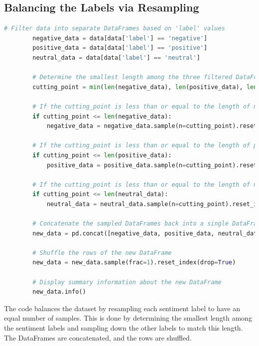 \documentclass{solutionclass} %
\begin{document}
\begin{solution}
        \subsection*{Balancing the Labels via Resampling}
        
        \begin{lstlisting}[language=Python, basicstyle=\ttfamily\footnotesize, keywordstyle=\color{blue}, commentstyle=\color{gray}]
        # Filter data into separate DataFrames based on 'label' values
        negative_data = data[data['label'] == 'negative']
        positive_data = data[data['label'] == 'positive']
        neutral_data = data[data['label'] == 'neutral']
        
        # Determine the smallest length among the three filtered DataFrames
        cutting_point = min(len(negative_data), len(positive_data), len(neutral_data))
        
        # If the cutting_point is less than or equal to the length of negative_data, sample down negative_data
        if cutting_point <= len(negative_data):
            negative_data = negative_data.sample(n=cutting_point).reset_index(drop=True)
        
        # If the cutting_point is less than or equal to the length of positive_data, sample down positive_data
        if cutting_point <= len(positive_data):
            positive_data = positive_data.sample(n=cutting_point).reset_index(drop=True)
        
        # If the cutting_point is less than or equal to the length of neutral_data, sample down neutral_data
        if cutting_point <= len(neutral_data):
            neutral_data = neutral_data.sample(n=cutting_point).reset_index(drop=True)
        
        # Concatenate the sampled DataFrames back into a single DataFrame
        new_data = pd.concat([negative_data, positive_data, neutral_data])
        
        # Shuffle the rows of the new DataFrame
        new_data = new_data.sample(frac=1).reset_index(drop=True)
        
        # Display summary information about the new DataFrame
        new_data.info()
        \end{lstlisting}
        
        The code balances the dataset by resampling each sentiment label to have an equal number of samples. This is done by determining the smallest length among the sentiment labels and sampling down the other labels to match this length. The DataFrames are concatenated, and the rows are shuffled.
        

\end{solution}
\end{document}
